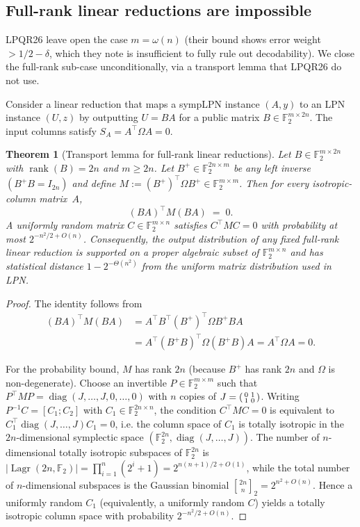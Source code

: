 \documentclass[11pt,a4paper]{article}
\theoremstyle{plain}
\newtheorem{theorem}{Theorem}[section]
\theoremstyle{definition}
\newcommand{\F}{\mathbb{F}}
\DeclareMathOperator{\Lagr}{Lagr}
\begin{document}
\subsection{Full-rank linear reductions are impossible}
\label{subsec:full-rank-linear}

LPQR26 leave open the case $m=\omega(n)$ (their bound shows error weight $>1/2-\delta$, which they note is insufficient to fully rule out decodability). We close the full-rank sub-case unconditionally, via a transport lemma that LPQR26 do not use.

Consider a linear reduction that maps a sympLPN instance $(A, y)$ to an LPN instance $(U, z)$ by outputting $U = BA$ for a public matrix $B \in \F_2^{m \times 2n}$. The input columns satisfy $S_A = A^{\top}\Omega A = 0$.

\begin{theorem}[Transport lemma for full-rank linear reductions]
\label{thm:transport-fullrank}
Let $B \in \F_2^{m \times 2n}$ with $\operatorname{rank}(B) = 2n$ and $m \ge 2n$. Let $B^{+} \in \F_2^{2n \times m}$ be any left inverse $(B^{+}B = I_{2n})$ and define $M := (B^{+})^{\top}\Omega B^{+} \in \F_2^{m \times m}$. Then for every isotropic-column matrix~$A$,
\[
(BA)^{\top} M (BA) \;=\; 0.
\]
A uniformly random matrix $C \in \F_2^{m \times n}$ satisfies $C^{\top} M C = 0$ with probability at most $2^{-n^2/2 + O(n)}$. Consequently, the output distribution of any fixed full-rank linear reduction is supported on a proper algebraic subset of $\F_2^{m \times n}$ and has statistical distance $1 - 2^{-\Theta(n^2)}$ from the uniform matrix distribution used in LPN.
\end{theorem}

\begin{proof}
The identity follows from
\begin{align*}
(BA)^{\top} M (BA)
&= A^{\top} B^{\top} (B^{+})^{\top} \Omega B^{+} B A \\
&= A^{\top} (B^{+}B)^{\top} \Omega (B^{+}B) A
= A^{\top}\Omega A = 0.
\end{align*}

For the probability bound, $M$ has rank $2n$ (because $B^{+}$ has rank $2n$ and $\Omega$ is non-degenerate). Choose an invertible $P \in \F_2^{m \times m}$ such that $P^{\top} M P = \operatorname{diag}(J,\dots,J,0,\dots,0)$ with $n$ copies of $J = \begin{psmallmatrix}0&1\\1&0\end{psmallmatrix}$. Writing $P^{-1}C = [C_1; C_2]$ with $C_1 \in \F_2^{2n \times n}$, the condition $C^{\top} M C = 0$ is equivalent to $C_1^{\top} \operatorname{diag}(J,\dots,J) C_1 = 0$, i.e. the column space of $C_1$ is totally isotropic in the $2n$-dimensional symplectic space $(\F_2^{2n}, \operatorname{diag}(J,\dots,J))$. The number of $n$-dimensional totally isotropic subspaces of $\F_2^{2n}$ is $|\Lagr(2n,\F_2)| = \prod_{i=1}^n (2^i+1) = 2^{n(n+1)/2+O(1)}$, while the total number of $n$-dimensional subspaces is the Gaussian binomial ${2n \brack n}_2 = 2^{n^2+O(n)}$. Hence a uniformly random $C_1$ (equivalently, a uniformly random $C$) yields a totally isotropic column space with probability $2^{-n^2/2+O(n)}$.
\end{proof}
\end{document}
